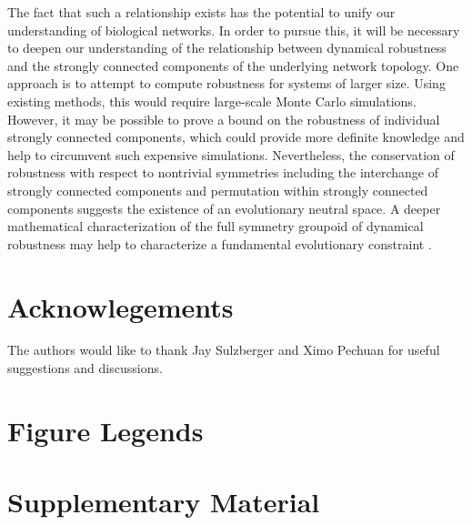 The fact that such a relationship exists has the potential to unify our understanding of biological networks. In order to pursue this, it will be necessary to deepen our understanding of the relationship between dynamical robustness and the strongly connected components of the underlying network topology. One approach is to attempt to compute robustness for systems of larger size. Using existing methods, this would require large-scale Monte Carlo simulations. However, it may be possible to prove a bound on the robustness of individual strongly connected components, which could provide more definite knowledge and help to circumvent such expensive simulations. Nevertheless, the conservation of robustness with respect to nontrivial symmetries including the interchange of strongly connected components and permutation within strongly connected components suggests the existence of an evolutionary neutral space. A deeper mathematical characterization of the full symmetry groupoid of dynamical robustness may help to characterize a fundamental evolutionary constraint \cite{Golubitsky2006}.

\section{Acknowlegements}  The authors would like to thank Jay Sulzberger and Ximo Pechuan for useful suggestions and discussions.

\pagebreak




\pagebreak
\FloatBarrier

\section{Figure Legends}


\pagebreak
\FloatBarrier

\beginsupplement
\setcounter{secnumdepth}{4}
\section{Supplementary Material}

% 

\pagebreak

\pagebreak


% 
% 



